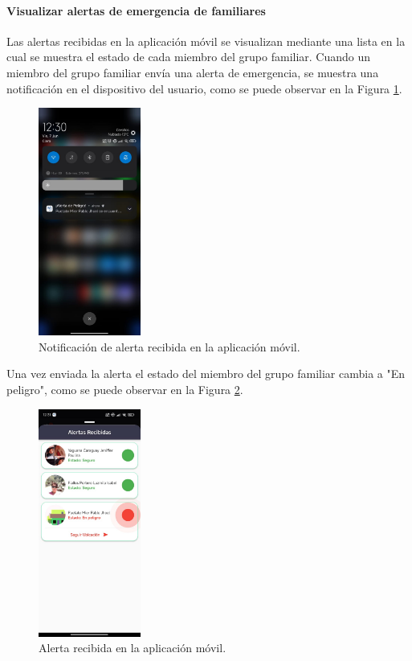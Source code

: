 \paragraph{Visualizar alertas de emergencia de familiares}
Las alertas recibidas en la aplicación móvil se visualizan mediante una lista en la cual se muestra el estado de cada miembro del
grupo familiar. Cuando un miembro del grupo familiar envía una alerta de emergencia, se muestra una notificación en el dispositivo
del usuario, como se puede observar en la Figura \ref{fig:notificacion-recibida-movil}.

\begin{figure}[H]
    \centering
    \includegraphics[width=0.3\textwidth]{chapters/III-resultados-y-discusion/resources/images/notificacion-recibida-movil.png}
    \caption{Notificación de alerta recibida en la aplicación móvil.}
    \label{fig:notificacion-recibida-movil}
\end{figure}

Una vez enviada la alerta el estado del miembro del grupo familiar cambia a "En peligro", como se puede observar en la Figura
\ref{fig:alerta-recibida-movil}.

\begin{figure}[H]
    \centering
    \includegraphics[width=0.3\textwidth]{chapters/III-resultados-y-discusion/resources/images/alerta-recibida-movil.png}
    \caption{Alerta recibida en la aplicación móvil.}
    \label{fig:alerta-recibida-movil}
\end{figure}

